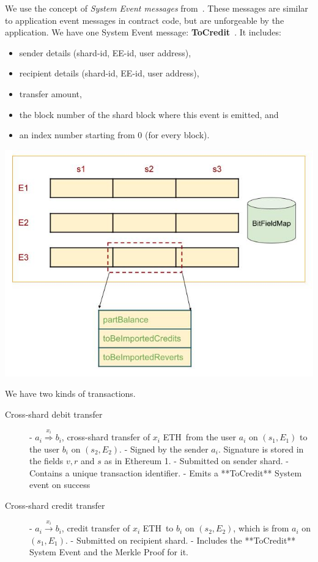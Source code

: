 \documentclass{article}
\newcommand{\eth}[0]{ETH~}
\newcommand{\tocredit}[0]{{\bf ToCredit}~}
\begin{document}
We use the concept of {\em System Event messages} from~\cite{peter-cross-shard}. These messages are similar to application event messages in contract code, but are unforgeable by the application. We have one System Event message: \tocredit. It includes:
\begin{itemize}
\item sender details (shard-id, EE-id, user address), 
\item recipient details (shard-id, EE-id, user address), 
\item transfer amount, 
\item the block number of the shard block where this event is emitted, and 
\item an index number starting from 0 (for every block).
\end{itemize}

\includegraphics{state.jpg}

We have two kinds of transactions. 
\begin{description}
\item[Cross-shard debit transfer]
	- $a_i \stackrel{x_i}{\Longrightarrow} b_i$, cross-shard transfer of $x_i$ \eth from the user $a_i$ on $(s_1,E_1)$ to the user $b_i$ on $(s_2,E_2)$. 
   - Signed by the sender $a_i$. Signature is stored in the fields $v, r$ and $s$ as in Ethereum 1.
	- Submitted on sender shard.
	- Contains a unique transaction identifier.
	- Emits a **ToCredit** System event on success
\item[Cross-shard credit transfer]
	- $a_i \stackrel{x_i}{\longrightarrow} b_i$,  credit transfer of $x_i$ \eth to $b_i$ on $(s_2,E_2)$, which is from $a_i$ on $(s_1, E_1)$.
	- Submitted on recipient shard.
	- Includes the **ToCredit** System Event and the Merkle Proof for it.
\end{description}
\end{document}
